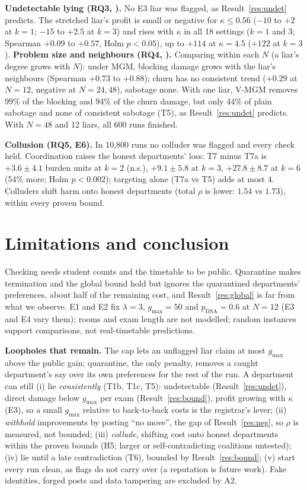 \documentclass{article}
\theoremstyle{definition}
\newcommand{\1}{\mathbf{1}}
\newcommand{\gmax}{g_{\max}}
\begin{document}
\textbf{Undetectable lying (RQ3, ).} No E3 liar was flagged, as Result~\ref{res:undet} predicts. The stretched liar's profit is small or negative for $\kappa\le0.56$ ($-10$ to $+2$ at $k=1$; $-15$ to $+2.5$ at $k=3$) and rises with $\kappa$ in all 18 settings ($k=1$ and $3$; Spearman $+0.09$ to $+0.57$, Holm $p<0.05$), up to $+114$ at $\kappa=4.5$ ($+122$ at $k=3$).
\textbf{Problem size and neighbours (RQ4, ).} Comparing within each $N$ (a liar's degree grows with $N$): under MGM, blocking damage grows with the liar's neighbours (Spearman $+0.73$ to $+0.88$); churn has no consistent trend ($+0.29$ at $N=12$, negative at $N=24,48$), sabotage none. With one liar, V-MGM removes 99\% of the blocking and 94\% of the churn damage, but only 44\% of plain sabotage and none of consistent sabotage (T5), as Result~\ref{res:undet} predicts. With $N=48$ and 12 liars, all 600 runs finished.

\textbf{Collusion (RQ5, E6).} In 10{,}800 runs no colluder was flagged and every check held. Coordination raises the honest departments' loss: T7 minus T7a is $+3.6\pm4.1$ burden units at $k=2$ (n.s.), $+9.1\pm5.8$ at $k=3$, $+27.8\pm8.7$ at $k=6$ (54\% more; Holm $p<0.002$); targeting alone (T7a vs T5) adds at most $4$. Colluders shift harm onto honest departments (total $\rho$ is lower: $1.54$ vs $1.73$), within every proven bound.

\section{Limitations and conclusion}
\label{sec:limits}
Checking needs student counts and the timetable to be public. Quarantine makes termination and the global bound hold but ignores the quarantined departments' preferences, about half of the remaining cost, and Result~\ref{res:global} is far from what we observe. E1 and E2 fix $\lambda=3$, $\gmax=50$ and $p_{\text{DSA}}=0.6$ at $N=12$ (E3 and E4 vary them); rooms and exam length are not modelled; random instances support comparisons, not real-timetable predictions.

\textbf{Loopholes that remain.} The cap lets an unflagged liar claim at most $\gmax$ above the public gain; quarantine, the only penalty, removes a caught department's say over its own preferences for the rest of the run. A department can still (i) lie \emph{consistently} (T1b, T1c, T5): undetectable (Result~\ref{res:undet}), direct damage below $\gmax$ per exam (Result~\ref{res:bound}), profit growing with $\kappa$ (E3), so a small $\gmax$ relative to back-to-back costs is the registrar's lever; (ii) \emph{withhold} improvements by posting ``no move'', the gap of Result~\ref{res:neg}, so $\rho$ is measured, not bounded; (iii) \emph{collude}, shifting cost onto honest departments within the proven bounds (H5; larger or self-contradicting coalitions untested); (iv) lie until a late contradiction (T6), bounded by Result~\ref{res:bound}; (v) start every run clean, as flags do not carry over (a reputation is future work). Fake identities, forged posts and data tampering are excluded by A2.
\end{document}
